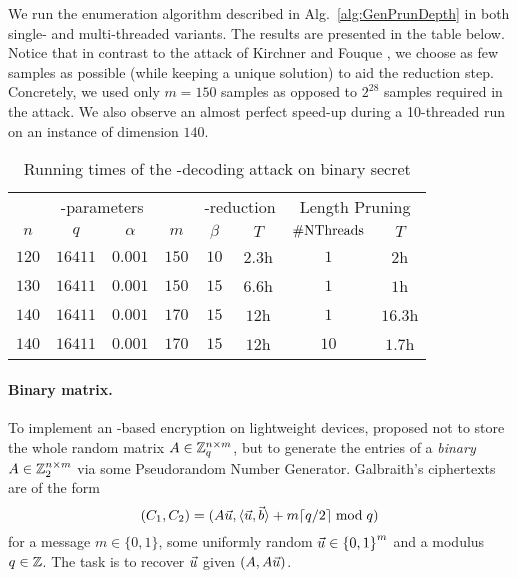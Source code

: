 We run the \BDD enumeration algorithm described in Alg.~\ref{alg:GenPrunDepth} in both single- and multi-threaded variants. The results are presented in the table below. Notice that in contrast to the \BKW attack of Kirchner and Fouque \cite{C:KirFou15}, we choose as few samples as possible (while keeping a unique solution) to aid the reduction step. Concretely, we used only $m=150$ \LWE samples as opposed to $2^{28}$ samples required in the \BKW attack. We also observe an almost perfect speed-up during a 10-threaded run on an instance of dimension $140$.  
\vspace{20pt}
\begin{table}[h]
	\centering
	\begin{tabular}{cccc|cc|cc}
		\toprule
		\multicolumn{4}{c|}{\LWE-parameters}               & \multicolumn{2}{c|}{\BKZ-reduction}  & \multicolumn{2}{c}{Length Pruning} \\
		$n$   & $q$      & $\alpha$                     & $m$   & $\beta$ & $T$         & $\mathrm{\#NThreads}$ &  $T$      \\\midrule
		$120$ & $16411$  & $0.001$                     & $150$ & $10$    & $2.3$h      &  $1$  & $2$h     \\
		$130$ & $16411$  & $0.001$                     & $150$ & $15$    & $6.6$h      &  $1$  & $1$h     \\ \midrule
		$140$ & $16411$  & $0.001$                     & $170$ & $15$    & $12$h       &  $1$  & $16.3$h  \\
		$140$ & $16411$  & $0.001$                     & $170$ & $15$    & $12$h       & $10$  & $1.7$h   \\\midrule[1pt]
	\end{tabular}
	\caption{Running times of the \BDD-decoding attack on binary secret \LWE}
	\label{table:RunTimesBinSecret}
\end{table}
\vspace{20pt}

\paragraph{Binary matrix.} To implement an \LWE-based encryption on lightweight devices, \cite{Galb} proposed not to store the whole random matrix $A \in {{\mathbb Z}}_q^{n \times m}$, but to generate the entries of a \emph{binary}
$A \in {{\mathbb Z}}_2^{n \times m}$ via some Pseudorandom Number Generator. Galbraith's ciphertexts are of the form
\[(C_1, C_2) = (A \vec u, \langle \vec u, \vec b \rangle + m \lceil q/2 \rceil \bmod q)
\]
for a message $m \in \{0,1\}$, some uniformly random $\vec u \in {\{0,1\}}^m$ and a modulus
$q \in {{\mathbb Z}}$. The task is to recover $\vec u$ given $(A, A \vec u)$.

